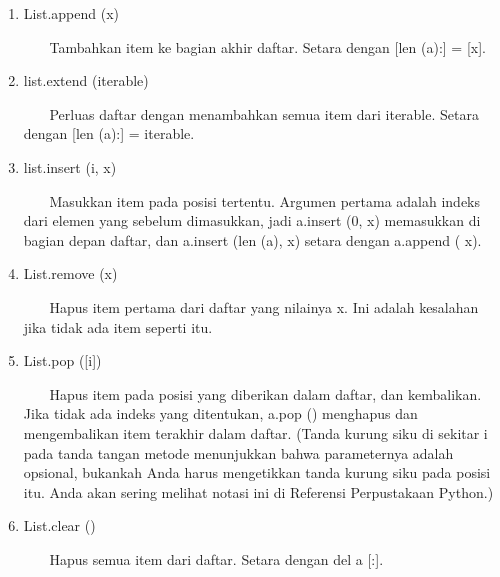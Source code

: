 \begin{enumerate}
\vspace{12pt}
\item
List.append (x) \par
\vspace{12pt}
~~~ Tambahkan item ke bagian akhir daftar. Setara dengan [len (a):] = [x]. \par
\vspace{12pt}
\item
list.extend (iterable) \par
\vspace{12pt}
~~~ Perluas daftar dengan menambahkan semua item dari iterable. Setara dengan [len (a):] = iterable. \par
\vspace{12pt}
\item
list.insert (i, x) \par
\vspace{12pt}
~~~ Masukkan item pada posisi tertentu. Argumen pertama adalah indeks dari elemen yang sebelum dimasukkan, jadi a.insert (0, x) memasukkan di bagian depan daftar, dan a.insert (len (a), x) setara dengan a.append ( x). \par
\vspace{12pt}
\item
List.remove (x) \par
\vspace{12pt}
~~~ Hapus item pertama dari daftar yang nilainya x. Ini adalah kesalahan jika tidak ada item seperti itu. \par
\vspace{12pt}
\item
List.pop ([i]) \par
\vspace{12pt}
~~~ Hapus item pada posisi yang diberikan dalam daftar, dan kembalikan. Jika tidak ada indeks yang ditentukan, a.pop () menghapus dan mengembalikan item terakhir dalam daftar. (Tanda kurung siku di sekitar i pada tanda tangan metode menunjukkan bahwa parameternya adalah opsional, bukankah Anda harus mengetikkan tanda kurung siku pada posisi itu. Anda akan sering melihat notasi ini di Referensi Perpustakaan Python.) \par
\vspace{12pt}
\item
List.clear () \par
\vspace{12pt}
~~~ Hapus semua item dari daftar. Setara dengan del a [:]. \par

\end{enumerate}

